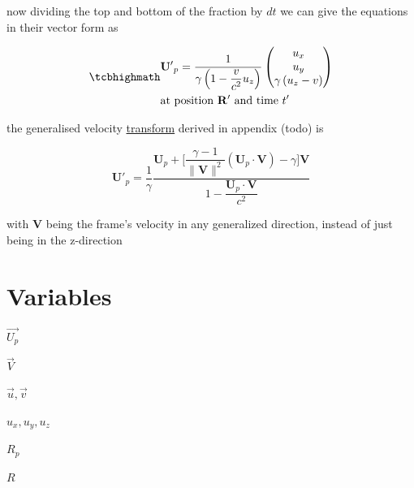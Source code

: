 now dividing the top and bottom of the fraction by $dt$ we can give the equations in their vector form as

\begin{equation}
	\label{vector velocity transform}
	\mhl{
		\begin{aligned}
			 & \mathbf{U'}_p = \dfrac{1}{\gamma\left(1- \dfrac{v}{c^2} u_z\right) }
			\begin{pmatrix}
				u_x                             \\
				u_y                             \\
				\gamma \left( u_z  - v  \right) \\
			\end{pmatrix}
			\\
			 & \text{at position $\mathbf{R'}$ and time $t'$ }
		\end{aligned}
	}
\end{equation}

the generalised velocity \hyperlink{def-transform}{transform} derived in appendix (todo) is

\begin{equation}
	\mathbf{U'}_p  = \dfrac{1}{\gamma} \dfrac{\mathbf{U}_p + \Big[\dfrac{\gamma-1}{\|\mathbf{V}\|^2}(\mathbf{U}_p\cdot \mathbf{V})- \gamma \Big] \mathbf{V}}{1 - \dfrac{\mathbf{U}_p\cdot\mathbf{V}}{c^2}}
\end{equation}

with $\mathbf{V}$ being the frame's velocity in any generalized direction, instead of just being in the z-direction

\section{Variables}



$\vec{U_p}$ \newline

$\vec{V}$ \newline

$\vec{u}, \vec{v}$ \newline

$u_x, u_y, u_z$ \newline

$R_p$ \newline

$R$  \newline

